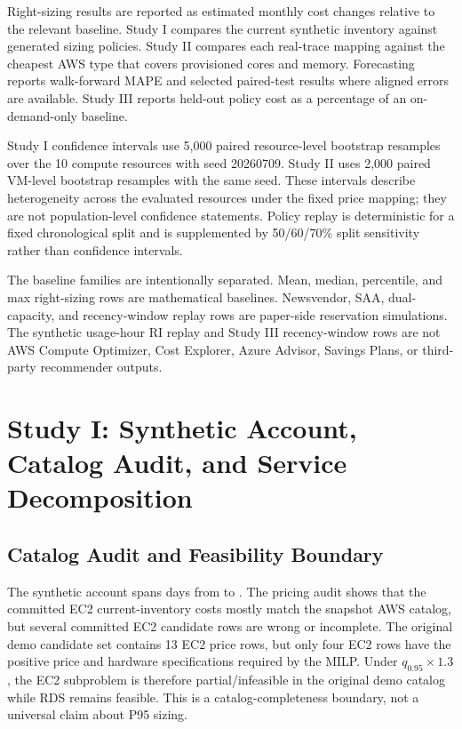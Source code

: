 \documentclass[11pt]{article}
\begin{document}
Right-sizing results are reported as estimated monthly cost changes relative
to the relevant baseline. Study I compares the current synthetic inventory
against generated sizing policies. Study II compares each real-trace mapping
against the cheapest AWS type that covers provisioned cores and memory.
Forecasting reports walk-forward MAPE and selected paired-test results where
aligned errors are available. Study III reports held-out policy cost as a
percentage of an on-demand-only baseline.

Study I confidence intervals use 5,000 paired resource-level bootstrap
resamples over the 10 compute resources with seed 20260709. Study II uses
2,000 paired VM-level bootstrap resamples with the same seed. These intervals
describe heterogeneity across the evaluated resources under the fixed price
mapping; they are not population-level confidence statements. Policy replay
is deterministic for a fixed chronological split and is supplemented by
50/60/70\% split sensitivity rather than confidence intervals.

The baseline families are intentionally separated. Mean, median, percentile,
and max right-sizing rows are mathematical baselines. Newsvendor, SAA,
dual-capacity, and recency-window replay rows are paper-side reservation
simulations. The synthetic usage-hour RI replay and Study III recency-window
rows are not AWS Compute Optimizer, Cost Explorer, Azure Advisor, Savings
Plans, or third-party recommender outputs.

\section{Study I: Synthetic Account, Catalog Audit, and Service Decomposition}
\label{sec:study1}

\subsection{Catalog Audit and Feasibility Boundary}

The synthetic account spans \nDays{} days from \dataStart{} to \dataEnd{}.
The pricing audit shows that the committed EC2 current-inventory costs mostly
match the snapshot AWS catalog, but several committed EC2 candidate rows are
wrong or incomplete. The original demo candidate set contains 13 EC2 price
rows, but only four EC2 rows have the positive price and hardware
specifications required by the MILP. Under $q_{0.95}\times1.3$, the EC2
subproblem is therefore partial/infeasible in the original demo catalog while
RDS remains feasible. This is a catalog-completeness boundary, not a
universal claim about P95 sizing.
\end{document}
